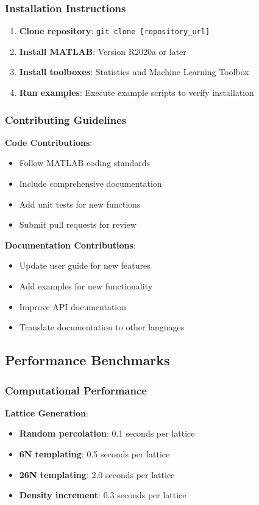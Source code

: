 \subsubsection{Installation Instructions}
\begin{enumerate}
    \item \textbf{Clone repository}: \texttt{git clone [repository\_url]}
    \item \textbf{Install MATLAB}: Version R2020a or later
    \item \textbf{Install toolboxes}: Statistics and Machine Learning Toolbox
    \item \textbf{Run examples}: Execute example scripts to verify installation
\end{enumerate}

\subsubsection{Contributing Guidelines}
\textbf{Code Contributions}:
\begin{itemize}
    \item Follow MATLAB coding standards
    \item Include comprehensive documentation
    \item Add unit tests for new functions
    \item Submit pull requests for review
\end{itemize}

\textbf{Documentation Contributions}:
\begin{itemize}
    \item Update user guide for new features
    \item Add examples for new functionality
    \item Improve API documentation
    \item Translate documentation to other languages
\end{itemize}

\subsection{Performance Benchmarks}

\subsubsection{Computational Performance}
\textbf{Lattice Generation}:
\begin{itemize}
    \item \textbf{Random percolation}: 0.1 seconds per lattice
    \item \textbf{6N templating}: 0.5 seconds per lattice
    \item \textbf{26N templating}: 2.0 seconds per lattice
    \item \textbf{Density increment}: 0.3 seconds per lattice
\end{itemize}

